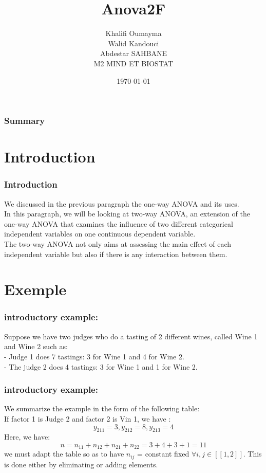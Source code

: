 \documentclass{beamer}
\title{ Anova2F}
\author{\color{rouge} Khalifi Oumayma\\Walid Kandouci\\ Abdestar SAHBANE\\\color{fandango} M2 MIND ET BIOSTAT}
\institute{Faculté des sciences Montpellier}
\date{\today}
\begin{document}
\begin{frame}
\titlepage
\end{frame}

\begin{frame}
\frametitle{Summary}
\tableofcontents
\end{frame}


\section{Introduction}
\begin{frame}
\frametitle{Introduction}
We discussed in the previous paragraph the one-way ANOVA and its uses.
\\
In this paragraph, we will be looking at two-way ANOVA, an extension of the one-way ANOVA that examines the influence of two different categorical independent variables on one continuous dependent variable. \\
The two-way ANOVA not only aims at assessing the main effect of each independent variable but also if there is any interaction between them.
\end{frame}






\section{Exemple}


\begin{frame}
\frametitle{introductory example:}
Suppose we have two judges who do a tasting of 2 different wines, called Wine 1 and Wine 2 such as:\\
- Judge 1 does 7 tastings: 3 for Wine 1 and 4 for Wine 2.\\
- The judge 2 does 4 tastings: 3 for Wine 1 and 1 for Wine 2.
\end{frame}

\begin{frame}
\frametitle{introductory example:}
We summarize the example in the form of the following table:\\




If factor 1 is Judge 2 and factor 2 is Vin 1, we have :$$y_{211}=3, y_{212}=8, y_{213}=4 $$
Here, we have: \\$$n= n_{1 1}+n_{1 2}+n_{2 1}+n_{2 2}=3+4+3+1=11$$
we must adapt the table so as to have $n_{ij}$ = constant fixed $\forall i,j\in[\![1, 2]\!]$.
 This is done either by eliminating or adding elements.

\end{frame}
\end{document}

